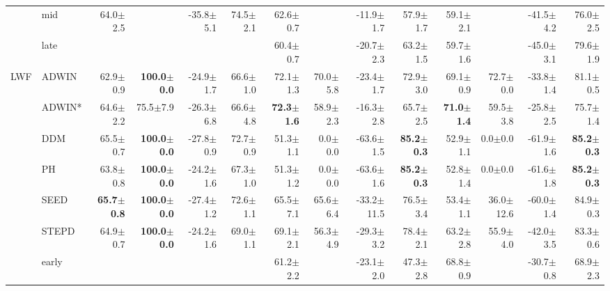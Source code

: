 \begin{tabular}{llrrrrrrrrrrrr}
 & mid & 64.0\tiny{$\pm$2.5} &  & -35.8\tiny{$\pm$5.1} & 74.5\tiny{$\pm$2.1} & 62.6\tiny{$\pm$0.7} &  & -11.9\tiny{$\pm$1.7} & 57.9\tiny{$\pm$1.7} & 59.1\tiny{$\pm$2.1} &  & -41.5\tiny{$\pm$4.2} & 76.0\tiny{$\pm$2.5} \\
 & late &  &  &  &  & 60.4\tiny{$\pm$0.7} &  & -20.7\tiny{$\pm$2.3} & 63.2\tiny{$\pm$1.5} & 59.7\tiny{$\pm$1.6} &  & -45.0\tiny{$\pm$3.1} & 79.6\tiny{$\pm$1.9} \\
\midrule
\multirow[t]{9}{*}{LWF} & ADWIN & 62.9\tiny{$\pm$0.9} & \textbf{100.0\tiny{$\pm$0.0}} & -24.9\tiny{$\pm$1.7} & 66.6\tiny{$\pm$1.0} & 72.1\tiny{$\pm$1.3} & 70.0\tiny{$\pm$5.8} & -23.4\tiny{$\pm$1.7} & 72.9\tiny{$\pm$3.0} & 69.1\tiny{$\pm$0.9} & 72.7\tiny{$\pm$0.0} & -33.8\tiny{$\pm$1.4} & 81.1\tiny{$\pm$0.5} \\
 & ADWIN* & 64.6\tiny{$\pm$2.2} & 75.5\tiny{$\pm$7.9} & -26.3\tiny{$\pm$6.8} & 66.6\tiny{$\pm$4.8} & \textbf{72.3\tiny{$\pm$1.6}} & 58.9\tiny{$\pm$2.3} & -16.3\tiny{$\pm$2.8} & 65.7\tiny{$\pm$2.5} & \textbf{71.0\tiny{$\pm$1.4}} & 59.5\tiny{$\pm$3.8} & -25.8\tiny{$\pm$2.5} & 75.7\tiny{$\pm$1.4} \\
 & DDM & 65.5\tiny{$\pm$0.7} & \textbf{100.0\tiny{$\pm$0.0}} & -27.8\tiny{$\pm$0.9} & 72.7\tiny{$\pm$0.9} & 51.3\tiny{$\pm$1.1} & 0.0\tiny{$\pm$0.0} & -63.6\tiny{$\pm$1.5} & \textbf{85.2\tiny{$\pm$0.3}} & 52.9\tiny{$\pm$1.1} & 0.0\tiny{$\pm$0.0} & -61.9\tiny{$\pm$1.6} & \textbf{85.2\tiny{$\pm$0.3}} \\
 & PH & 63.8\tiny{$\pm$0.8} & \textbf{100.0\tiny{$\pm$0.0}} & -24.2\tiny{$\pm$1.6} & 67.3\tiny{$\pm$1.0} & 51.3\tiny{$\pm$1.2} & 0.0\tiny{$\pm$0.0} & -63.6\tiny{$\pm$1.6} & \textbf{85.2\tiny{$\pm$0.3}} & 52.8\tiny{$\pm$1.4} & 0.0\tiny{$\pm$0.0} & -61.6\tiny{$\pm$1.8} & \textbf{85.2\tiny{$\pm$0.3}} \\
 & SEED & \textbf{65.7\tiny{$\pm$0.8}} & \textbf{100.0\tiny{$\pm$0.0}} & -27.4\tiny{$\pm$1.2} & 72.6\tiny{$\pm$1.1} & 65.5\tiny{$\pm$7.1} & 65.6\tiny{$\pm$6.4} & -33.2\tiny{$\pm$11.5} & 76.5\tiny{$\pm$3.4} & 53.4\tiny{$\pm$1.1} & 36.0\tiny{$\pm$12.6} & -60.0\tiny{$\pm$1.4} & 84.9\tiny{$\pm$0.3} \\
 & STEPD & 64.9\tiny{$\pm$0.7} & \textbf{100.0\tiny{$\pm$0.0}} & -24.2\tiny{$\pm$1.6} & 69.0\tiny{$\pm$1.1} & 69.1\tiny{$\pm$2.1} & 56.3\tiny{$\pm$4.9} & -29.3\tiny{$\pm$3.2} & 78.4\tiny{$\pm$2.1} & 63.2\tiny{$\pm$2.8} & 55.9\tiny{$\pm$4.0} & -42.0\tiny{$\pm$3.5} & 83.3\tiny{$\pm$0.6} \\
 & early &  &  &  &  & 61.2\tiny{$\pm$2.2} &  & -23.1\tiny{$\pm$2.0} & 47.3\tiny{$\pm$2.8} & 68.8\tiny{$\pm$0.9} &  & -30.7\tiny{$\pm$0.8} & 68.9\tiny{$\pm$2.3} \\

\end{tabular}

